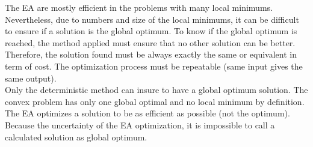 The EA are mostly efficient in the problems with many local minimums. Nevertheless, due to numbers and size of the local minimums, it can be difficult to ensure if a solution is the global optimum. 
To know if the global optimum is reached, the method applied must ensure that no other solution can be better. Therefore, the solution found must be always exactly the same or equivalent in term of cost. The optimization process must be repeatable (same input gives the same output).\\
 Only the deterministic method can insure to have a global optimum solution. The convex problem has only one global optimal and no local minimum by definition. \\%
  The EA optimizes a solution to be as efficient as possible (not the optimum). Because the uncertainty of the EA optimization, it is impossible to call a calculated solution as global optimum.
 
